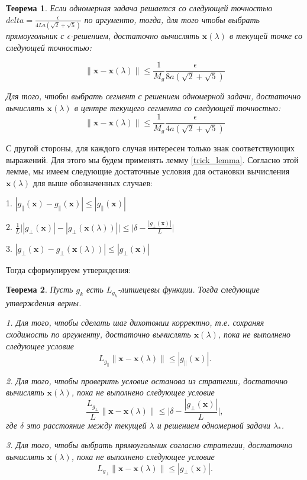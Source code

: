 \documentclass[12pt]{article}
\newtheorem{theorem}{Теорема}[section]
\begin{document}
\begin{theorem}
\label{StonPas_Dual}
Если одномерная задача решается со следующей точностью $delta =  \frac{\epsilon}{4La(\sqrt{2}+\sqrt{5})}$ по аргументо, тогда, для того чтобы выбрать прямоугольник с $\epsilon$-решением, достаточно вычислять $\textbf{x}(\lambda)$ в текущей точке со следующей точностью:

\begin{equation}
\|\textbf{x} - \textbf{x}(\lambda)\| \leq \frac{1}{M_g}\frac{\epsilon}{8a(\sqrt{2}+\sqrt{5})}
\end{equation}

Для того, чтобы выбрать сегмент с решением одномерной задачи, достаточно вычислять $\textbf{x}(\lambda)$ в центре текущего сегмента со следующей точностью:
\begin{equation}
\|\textbf{x} - \textbf{x}(\lambda)\| \leq \frac{1}{M_g}\frac{\epsilon}{4a(\sqrt{2}+\sqrt{5})}
\end{equation}
\end{theorem}

С другой стороны, для каждого случая интересен только знак соответствующих выражений. Для этого мы будем применять  лемму \ref{trick_lemma}. Согласно этой лемме, мы имеем следующие достаточные условия для остановки вычисления $\textbf{x}(\lambda)$ для выше обозначенных случаев:

1. $|g_\parallel(\textbf{x})-g_\parallel(\textbf{x})|\leq |g_\parallel(\textbf{x})|$

2. $\frac{1}{L}\Big||g_\perp(\textbf{x})|-|g_\perp(\textbf{x}(\lambda))|\Big|\leq \Big|\delta-\frac{|g_\perp(\textbf{x})|}{L}\Big|$

3. $|g_\perp(\textbf{x})-g_\perp(\textbf{x}(\lambda))|\leq |g_\perp(\textbf{x})|$

Тогда сформулируем утверждения:

\begin{theorem}\label{x_lambda}
Пусть $g_k$ есть $L_{g_k}$-липшецевы функции. Тогда следующие утверждения верны.

1. Для того, чтобы сделать шаг дихотомии корректно, т.е. сохраняя сходимость по аргументу, достаточно вычислять $\textbf{x}(\lambda)$, пока не выполнено следующее условие
$$L_{g_\parallel}\|\textbf{x}-\textbf{x}(\lambda)\|\leq |g_\parallel(\textbf{x})|.$$

2. Для того, чтобы проверить условие останова из стратегии, достаточно вычислять $\textbf{x}(\lambda)$, пока не выполнено следующее условие
$$\frac{L_{g_\perp}}{L}\|\textbf{x}-\textbf{x}(\lambda)\|\leq\Big|\delta-\frac{|g_\perp(\textbf{x})|}{L}\Big|,$$
где $\delta$ это расстояние между текущей $\lambda$ и решением одномерной задачи $\lambda_*$.

3. Для того, чтобы выбрать прямоугольник согласно стратегии, достаточно вычислять $\textbf{x}(\lambda)$, пока не выполнено следующее условие
$$L_{g_\perp}\|\textbf{x}-\textbf{x}(\lambda)\|\leq |g_\perp(\textbf{x})|.$$
\end{theorem}
\end{document}
